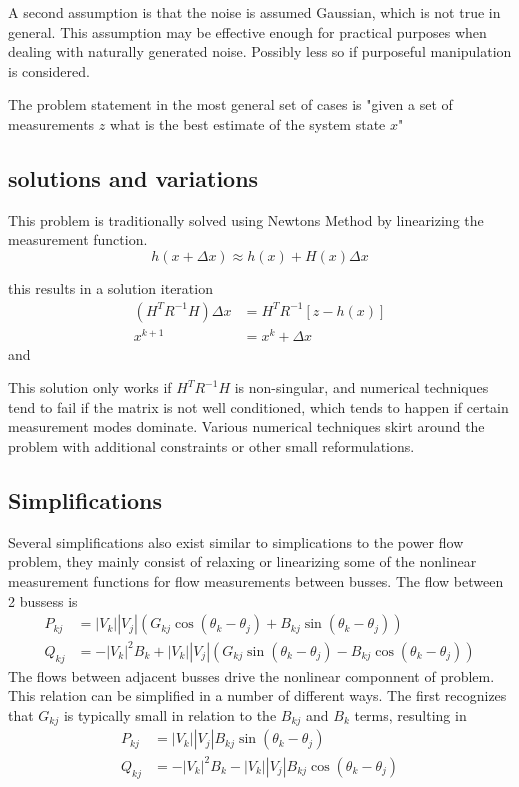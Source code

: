 \documentclass[11pt]{article} %
\begin{document}
A second assumption is that the noise is assumed Gaussian,  which is not true in general. This assumption may be effective enough for practical purposes when dealing with naturally generated noise.  Possibly less so if purposeful manipulation is considered. 

The problem statement in the most general set of cases is "given a set of measurements $z$ what is the best estimate of the system state $x$" 
\subsection{solutions and variations}
This problem is traditionally solved using Newtons Method by linearizing the measurement function.  
\begin{equation}
h(x+\Delta x) \approx h(x)+H(x)\Delta x
\end{equation}

this results in a solution iteration
\begin{equation}
\begin{aligned}
\left(H^TR^{-1}H\right)\Delta x &= H^TR^{-1}\left[z-h(x)\right] \\
x^{k+1} &= x^k+\Delta x
\end{aligned}
\end{equation}
and


This solution only works if $H^TR^{-1}H$ is non-singular,  and numerical techniques tend to fail if the matrix is not well conditioned, which tends to happen if certain measurement modes dominate.  Various numerical techniques skirt around the problem with additional constraints or other small reformulations.  



\subsection{Simplifications}
Several simplifications also exist similar to simplications to the power flow problem, they mainly consist of relaxing or linearizing some of the nonlinear measurement functions for flow measurements between busses.  The flow between 2 bussess is 
\begin{equation}\label{Eq:powerflow}
\begin{aligned}
P_{kj} &= |V_k||V_j|\left(G_{kj}\cos(\theta_k-\theta_j) +  B_{kj}\sin(\theta_k-\theta_j)\right)\\
Q_{kj} &=  -|V_k|^2 B_{k}+|V_k||V_j|\left(G_{kj}\sin(\theta_k-\theta_j) - B_{kj}\cos(\theta_k-\theta_j)\right)
\end{aligned}
\end{equation}
The flows between adjacent busses drive the nonlinear componnent of problem.  This relation can be simplified in a number of different ways.  The first recognizes that $G_{kj}$ is typically small in relation to the $B_{kj}$ and $B_k$ terms,  resulting in
\begin{equation}\label{Eq:powerflow}
\begin{aligned}
P_{kj} &= |V_k||V_j| B_{kj}\sin(\theta_k-\theta_j)\\
Q_{kj} &=  -|V_k|^2 B_{k}-|V_k||V_j| B_{kj}\cos(\theta_k-\theta_j)
\end{aligned}
\end{equation}
\end{document}
